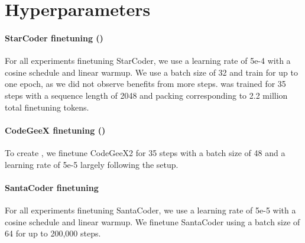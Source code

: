 \begin{table}[htbp]
\centering
{}
\caption{\textbf{Breakdown of \evalf{} Python pass@1 (\%) performance by bug type for select models.} Statistics for each bug type are in \autoref{tab:bugtypes}.}
\label{tab:bugtypeperf}
\end{table}


\FloatBarrier


\section{Hyperparameters}
\label{sec:hyperparameters}

\paragraph{StarCoder finetuning (\model{})} For all experiments finetuning StarCoder, we use a learning rate of 5e-4 with a cosine schedule and linear warmup. We use a batch size of 32 and train for up to one epoch, as we did not observe benefits from more steps. \model{} was trained for 35 steps with a sequence length of 2048 and packing corresponding to 2.2 million total finetuning tokens.

\paragraph{CodeGeeX finetuning (\modelx{})} To create \modelx{}, we finetune CodeGeeX2 for 35 steps with a batch size of 48 and a learning rate of 5e-5 largely following the \model{} setup.

\paragraph{SantaCoder finetuning} For all experiments finetuning SantaCoder, we use a learning rate of 5e-5 with a cosine schedule and linear warmup. We finetune SantaCoder using a batch size of 64 for up to 200,000 steps.

